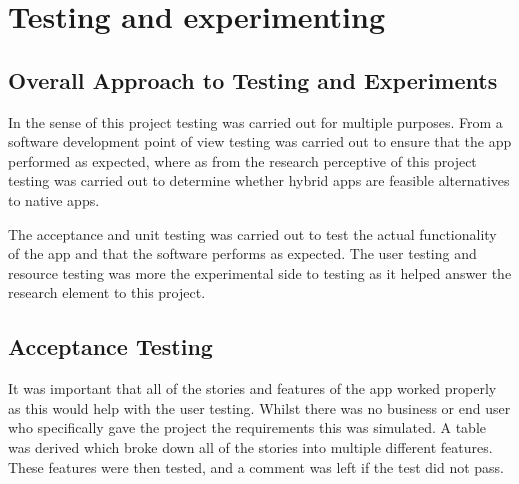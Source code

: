 \chapter{Testing and experimenting}


\section{Overall Approach to Testing and Experiments}
In the sense of this project testing was carried out for multiple purposes. From a software development point of view testing was carried out to ensure that the app performed as expected, where as from the research perceptive of this project testing was carried out to determine whether hybrid apps are feasible alternatives to native apps.

The acceptance and unit testing was carried out to test the actual functionality of the app and that the software performs as expected. The user testing and resource testing was more the experimental side to testing as it helped answer the research element to this project.

\section{Acceptance Testing}
It was important that all of the stories and features of the app worked properly as this would help with the user testing. Whilst there was no business or end user who specifically gave the project the requirements this was simulated. A table was derived which broke down all of the stories into multiple different features. These features were then tested, and a comment was left if the test did not pass.

